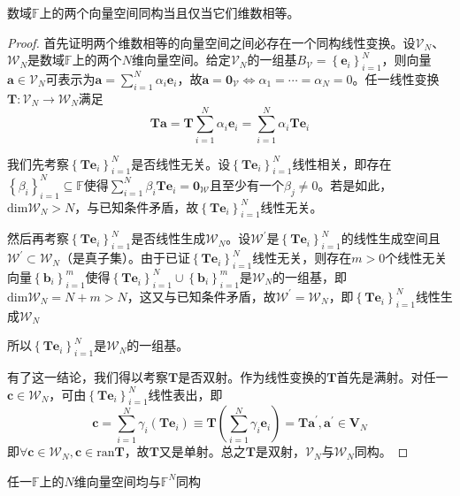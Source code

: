 \documentclass[main.tex]{subfiles}
\begin{document}
\begin{theorem}\label{thm:II.4.6}
数域$\mathbb{F}$上的两个向量空间同构当且仅当它们维数相等。
\end{theorem}
\begin{proof}
首先证明两个维数相等的向量空间之间必存在一个同构线性变换。设$\mathcal{V}_N$、$\mathcal{W}_N$是数域$\mathbb{F}$上的两个$N$维向量空间。给定$\mathcal{V}_N$的一组基$B_\mathcal{V}=\left\{\mathbf{e}_i\right\}_{i=1}^N$，则向量$\mathbf{a}\in\mathcal{V}_N$可表示为$\mathbf{a}=\sum_{i=1}^N\alpha_i\mathbf{e}_i$，故$\mathbf{a}=\mathbf{0}_\mathcal{V}\Leftrightarrow\alpha_1=\cdots=\alpha_N=0$。任一线性变换$\mathbf{T}:\mathcal{V}_N\rightarrow\mathcal{W}_N$满足
\[\mathbf{Ta}=\mathbf{T}\sum_{i=1}^N\alpha_i\mathbf{e}_i=\sum_{i=1}^N\alpha_i\mathbf{Te}_i\]

我们先考察$\left\{\mathbf{Te}_i\right\}_{i=1}^N$是否线性无关。设$\left\{\mathbf{Te}_i\right\}_{i=1}^N$线性相关，即存在$\left\{\beta_i\right\}_{i=1}^N\subseteq\mathbb{F}$使得$\sum_{i=1}^N\beta_i\mathbf{Te}_i=\mathbf{0}_\mathcal{W}$且至少有一个$\beta_j\neq0$。若是如此，$\mathrm{dim}\mathcal{W}_N>N$，与已知条件矛盾，故$\left\{\mathbf{Te}_i\right\}_{i=1}^N$线性无关。

然后再考察$\left\{\mathbf{Te}_i\right\}_{i=1}^N$是否线性生成$\mathcal{W}_N$。设$\mathcal{W}^\prime$是$\left\{\mathbf{Te}_i\right\}_{i=1}^N$的线性生成空间且$\mathcal{W}^\prime\subset\mathcal{W}_N$（是真子集）。由于已证$\left\{\mathbf{Te}_i\right\}_{i=1}^N$线性无关，则存在$m>0$个线性无关向量$\left\{\mathbf{b}_i\right\}_{i=1}^m$使得$\left\{\mathbf{Te}_i\right\}_{i=1}^N\cup\left\{\mathbf{b}_i\right\}_{i=1}^m$是$\mathcal{W}_N$的一组基，即$\mathrm{dim}\mathcal{W}_N=N+m>N$，这又与已知条件矛盾，故$\mathcal{W}^\prime=\mathcal{W}_N$，即$\left\{\mathbf{Te}_i\right\}_{i=1}^N$线性生成$\mathcal{W}_N$

所以$\left\{\mathbf{Te}_i\right\}_{i=1}^N$是$\mathcal{W}_N$的一组基。

有了这一结论，我们得以考察$\mathbf{T}$是否双射。作为线性变换的$\mathbf{T}$首先是满射。对任一$\mathbf{c}\in\mathcal{W}_N$，可由$\left\{\mathbf{Te}_i\right\}_{i=1}^N$线性表出，即
\[\mathbf{c}=\sum_{i=1}^N\gamma_i\left(\mathbf{Te}_i\right)\equiv\mathbf{T}\left(\sum_{i=1}^N\gamma_i\mathbf{e}_i\right)=\mathbf{Ta}^\prime,\mathbf{a}^\prime\in\mathbf{V}_N\]
即$\forall\mathbf{c}\in\mathcal{W}_N,\mathbf{c}\in\mathrm{ran}\mathbf{T}$，故$\mathbf{T}$又是单射。总之$\mathbf{T}$是双射，$\mathcal{V}_N$与$\mathcal{W}_N$同构。
\end{proof}

\begin{corollary}
任一$\mathbb{F}$上的$N$维向量空间均与$\mathbb{F}^N$同构
\end{corollary}
\end{document}
